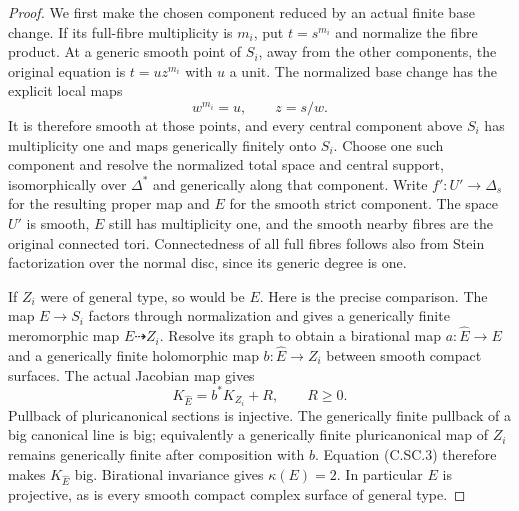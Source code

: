 \begin{proof}
We first make the chosen component reduced by an
actual finite base change. If its full-fibre
multiplicity is $m_i$, put $t=s^{m_i}$ and normalize
the fibre product. At a generic smooth point of
$S_i$, away from the other components, the original
equation is $t=u z^{m_i}$ with $u$ a unit. The
normalized base change has the explicit local maps
\[
                  w^{m_i}=u,\qquad z=s/w.
 \tag{C.SC.2}
\]
It is therefore smooth at those points, and every
central component above $S_i$ has multiplicity one
and maps generically finitely onto $S_i$. Choose one
such component and resolve the normalized total
space and central support, isomorphically over
$\Delta^*$ and generically along that component.
Write $f':U'\to\Delta_s$ for the resulting proper
map and $E$ for the smooth strict component. The
space $U'$ is smooth, $E$ still has multiplicity
one, and the smooth nearby fibres are the original
connected tori. Connectedness of all full fibres
follows also from Stein factorization over the
normal disc, since its generic degree is one.

If $Z_i$ were of general type, so would be $E$.
Here is the precise comparison. The map $E\to S_i$
factors through normalization and gives a
generically finite meromorphic map $E\dashrightarrow
Z_i$. Resolve its graph to obtain a birational
map $a:\widehat E\to E$ and a generically finite
holomorphic map $b:\widehat E\to Z_i$ between
smooth compact surfaces. The actual Jacobian map
gives
\[
                 K_{\widehat E}=b^*K_{Z_i}+R,
                 \qquad R\ge0.                 \tag{C.SC.3}
\]
Pullback of pluricanonical sections is injective.
The generically finite pullback of a big canonical
line is big; equivalently a generically finite
pluricanonical map of $Z_i$ remains generically
finite after composition with $b$. Equation
(C.SC.3) therefore makes $K_{\widehat E}$ big.
Birational invariance gives $\kappa(E)=2$.
In particular $E$ is projective, as is every
smooth compact complex surface of general type.


\end{proof}
